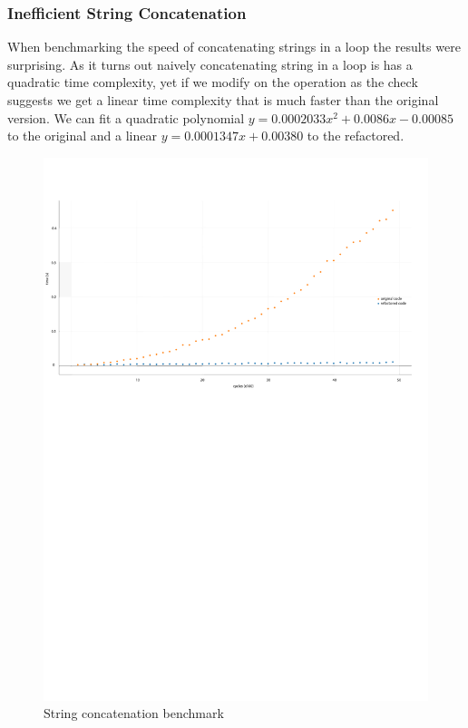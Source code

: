 \subsubsection{Inefficient String Concatenation}
\par When benchmarking the speed of concatenating strings in a loop the results were surprising. As it turns out naively concatenating string in a loop is has a quadratic time complexity, yet if we modify on the operation as the check suggests we get a linear time complexity that is much faster than the original version. We can fit a quadratic polynomial $y=0.0002033x^2+0.0086x-0.00085$ to the original and a linear $y=0.0001347x+0.00380$ to the refactored. 
\begin{figure}[H]
	\caption{String concatenation benchmark}
	\includegraphics[scale=0.7]{images/string_concat.pdf}
\end{figure}
